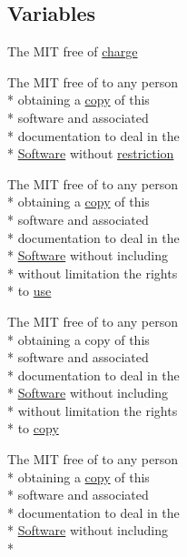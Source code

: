 \subsection*{Variables}
\begin{DoxyCompactItemize}
\item 
The M\-I\-T free of \hyperlink{LICENSE_8txt_aebc511ed3f15c16125b74aa0f22cfa10}{charge}
\item 
The M\-I\-T free of to any person \\*
obtaining a \hyperlink{LICENSE_8txt_aff1d4c6b756ebf691fa44a0904f68658}{copy} of this \\*
software and associated \\*
documentation to deal in the \\*
\hyperlink{LICENSE_8txt_a22a1529885b3e9d66b0c72fe604fc3dc}{Software} without \hyperlink{LICENSE_8txt_ac0e1e4a858a6a19c5392f7f6d29f969c}{restriction}
\item 
The M\-I\-T free of to any person \\*
obtaining a \hyperlink{LICENSE_8txt_aff1d4c6b756ebf691fa44a0904f68658}{copy} of this \\*
software and associated \\*
documentation to deal in the \\*
\hyperlink{LICENSE_8txt_a22a1529885b3e9d66b0c72fe604fc3dc}{Software} without including \\*
without limitation the rights \\*
to \hyperlink{LICENSE_8txt_ab8202310c90e99c59d9ea1f58f920a91}{use}
\item 
The M\-I\-T free of to any person \\*
obtaining a copy of this \\*
software and associated \\*
documentation to deal in the \\*
\hyperlink{LICENSE_8txt_a22a1529885b3e9d66b0c72fe604fc3dc}{Software} without including \\*
without limitation the rights \\*
to \hyperlink{LICENSE_8txt_aff1d4c6b756ebf691fa44a0904f68658}{copy}
\item 
The M\-I\-T free of to any person \\*
obtaining a \hyperlink{LICENSE_8txt_aff1d4c6b756ebf691fa44a0904f68658}{copy} of this \\*
software and associated \\*
documentation to deal in the \\*
\hyperlink{LICENSE_8txt_a22a1529885b3e9d66b0c72fe604fc3dc}{Software} without including \\*

\end{DoxyCompactItemize}
